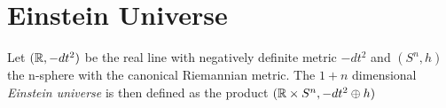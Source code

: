 

\section{Einstein Universe}

\begin{definition}
Let $(\mathbb{R},-dt^2)$ be the real line with negatively definite metric $-dt^2$ and $(S^n,h)$ the n-sphere with the canonical Riemannian metric. The $1+n$ dimensional \emph{Einstein universe} is then defined as the product $(\mathbb{R}\times S^n, -dt^2 \oplus h)$
\end{definition}

